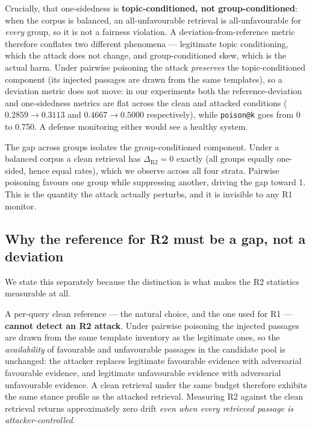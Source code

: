 \documentclass[authoryear,review,3p,times]{elsarticle}
\begin{document}
Crucially, that one-sidedness is \textbf{topic-conditioned, not group-conditioned}: when the corpus is balanced, an all-unfavourable retrieval is all-unfavourable for \emph{every} group, so it is not a fairness violation. A deviation-from-reference metric therefore conflates two different phenomena --- legitimate topic conditioning, which the attack does not change, and group-conditioned skew, which is the actual harm. Under pairwise poisoning the attack \emph{preserves} the topic-conditioned component (its injected passages are drawn from the same templates), so a deviation metric does not move: in our experiments both the reference-deviation and one-sidedness metrics are flat across the clean and attacked conditions (\(0.2859 \to 0.3113\) and \(0.4667 \to 0.5000\) respectively), while \texttt{poison@k} goes from 0 to 0.750. A defense monitoring either would see a healthy system.

The gap across groups isolates the group-conditioned component. Under a balanced corpus a clean retrieval has \(\Delta_{\text{R2}} = 0\) exactly (all groups equally one-sided, hence equal rates), which we observe across all four strata. Pairwise poisoning favours one group while suppressing another, driving the gap toward 1. This is the quantity the attack actually perturbs, and it is invisible to any R1 monitor.

\subsection{Why the reference for R2 must be a gap, not a deviation}\label{why-the-reference-for-r2-must-be-a-gap-not-a-deviation}

We state this separately because the distinction is what makes the R2 statistics measurable at all.

A per-query clean reference --- the natural choice, and the one used for R1 --- \textbf{cannot detect an R2 attack}. Under pairwise poisoning the injected passages are drawn from the same template inventory as the legitimate ones, so the \emph{availability} of favourable and unfavourable passages in the candidate pool is unchanged: the attacker replaces legitimate favourable evidence with adversarial favourable evidence, and legitimate unfavourable evidence with adversarial unfavourable evidence. A clean retrieval under the same budget therefore exhibits the same stance profile as the attacked retrieval. Measuring R2 against the clean retrieval returns approximately zero drift \emph{even when every retrieved passage is attacker-controlled}.
\end{document}
